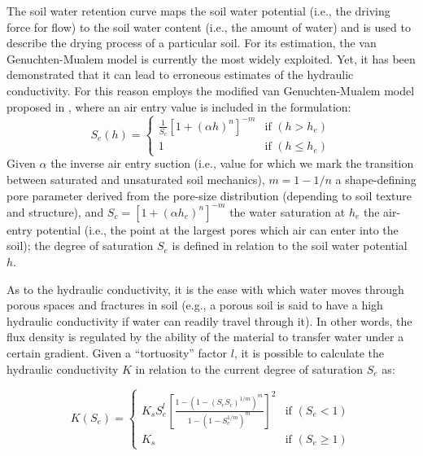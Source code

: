 The soil water retention curve maps the soil water potential  (i.e., the driving force for flow) to the soil water content (i.e., the amount of water) and is used to describe the drying process of a particular soil.
For its estimation, the van Genuchten-Mualem model is currently the most widely exploited.
Yet, it has been demonstrated that it can lead to erroneous estimates of the hydraulic conductivity.
For this reason \olab{} employs the modified van Genuchten-Mualem model proposed in \cite{ippisch-etal-2006}, where an air entry value is included in the formulation: 
\begin{equation}
\label{ippisch}
S_e(h)=          \left\{ \begin{array}{ll}
\frac{1}{S_c} \left[1+(\alpha h)^n \right]^{-m} &\mbox{if $(h > h_e)$}\\
1                             &\mbox{if $(h \leq h_e)$}
           \end{array}
        \right.
\end{equation}
Given $\alpha$ the inverse air entry suction (i.e., value for which we mark the transition between saturated and unsaturated soil mechanics), $m = 1 - 1/n$ a shape-defining pore parameter derived from the pore-size distribution (depending to soil texture and structure), and $S_c = [1+ (\alpha h_e)^n]^{-m}$ the water saturation at $h_e$ the air-entry potential (i.e., the point at the largest pores which air can enter into the soil); the degree of saturation $S_e$ is defined in relation to the soil water potential $h$.

As to the hydraulic conductivity, it is the ease with which water moves through porous spaces and fractures in soil (e.g., a porous soil is said to have a high hydraulic conductivity if water can readily travel through it).
In other words, the flux density is regulated by the ability of the material to transfer water under a certain gradient.
Given a ``tortuosity'' factor $l$, it is possible to calculate the hydraulic conductivity $K$ in relation to the current degree of saturation $S_e$ as:

\begin{equation}
\label{ippisch2} K(S_e)=          \left\{ \begin{array}{ll}
K_s S_e^l \left[\frac{1-(1-(S_e S_c)^{1/m})^m}{1-(1-S_c^{1/m})^m} \right]^{2} &\mbox{if $(S_e < 1)$}\\
K_s                             &\mbox{if $(S_e \geq 1)$}
           \end{array}
        \right.
\end{equation}

